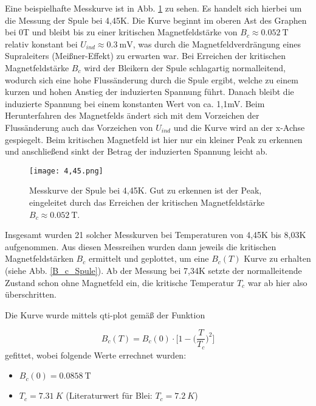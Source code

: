 Eine beispielhafte Messkurve ist in Abb. \ref{4,45} zu sehen. Es handelt sich hierbei um die Messung der Spule bei 4,45K. Die Kurve beginnt im oberen Ast des Graphen bei 0T und bleibt bis zu einer kritischen Magnetfeldstärke von $B_{c}\approx\SI{0,052}{\tesla}$ relativ konstant bei $U_{ind}\approx\SI{0,3}{\milli\volt}$, was durch die Magnetfeldverdrängung eines Supraleiters (Meißner-Effekt) zu erwarten war. Bei Erreichen der kritischen Magnetfeldstärke $B_{c}$ wird der Bleikern der Spule schlagartig normalleitend, wodurch sich eine hohe Flussänderung durch die Spule ergibt, welche zu einem kurzen und hohen Anstieg der induzierten Spannung führt. Danach bleibt die induzierte Spannung bei einem konstanten Wert von ca. 1,1mV. Beim Herunterfahren des Magnetfelds ändert sich mit dem Vorzeichen der Flussänderung auch das Vorzeichen von $U_{ind}$ und die Kurve wird an der x-Achse gespiegelt. Beim kritischen Magnetfeld ist hier nur ein kleiner Peak zu erkennen und anschließend sinkt der Betrag der induzierten Spannung leicht ab. 


\begin{figure}[H]
	\begin{center}
		\texttt{[image: 4,45.png]}
		\caption{Messkurve der Spule bei 4,45K. Gut zu erkennen ist der Peak, eingeleitet durch das Erreichen der kritischen Magnetfeldstärke $B_{c}\approx\SI{0,052}{\tesla}$.}
		\label{4,45}
	\end{center}
\end{figure}

Insgesamt wurden 21 solcher Messkurven bei Temperaturen von 4,45K bis 8,03K aufgenommen. Aus diesen Messreihen wurden dann jeweils die kritischen Magnetfeldstärken $B_{c}$ ermittelt und geplottet, um eine $B_{c} (T)$ Kurve zu erhalten (siehe Abb. \ref{B_c_Spule}). Ab der Messung bei 7,34K setzte der normalleitende Zustand schon ohne Magnetfeld ein, die kritische Temperatur $T_{c}$ war ab hier also überschritten.

Die Kurve wurde mittels qti-plot gemäß der Funktion

\[B_{c}(T)=B_{c}(0)\cdot\bigg[1-\Big(\dfrac{T}{T_{c}}\Big)^2\bigg] \] 
gefittet, wobei folgende Werte errechnet wurden:
\begin{itemize}
	\item $B_{c}(0)=\SI{0,0858}{\tesla}$
	\item $T_{c}=\SI{7,31}{K}$ (Literaturwert für Blei: $T_{c}=\SI{7,2}{K}$)
\end{itemize}




